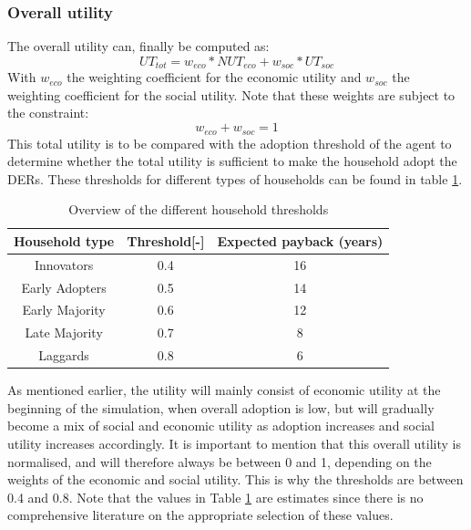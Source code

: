 \subsubsection{Overall utility}
The overall utility can, finally be computed as:
\begin{equation} \label{totut}
    UT_{tot} = w_{eco}*NUT_{eco} + w_{soc}*UT_{soc}
\end{equation}
With $w_{eco}$ the weighting coefficient for the economic utility and $w_{soc}$ the weighting coefficient for the social utility. Note that these weights are subject to the constraint:
\begin{equation}
    w_{eco} + w_{soc} = 1
\end{equation}
This total utility is to be compared with the adoption threshold of the agent to determine whether the total utility is sufficient to make the household adopt the DERs. These thresholds for different types of households can be found in table \ref{table:threshold}.
\begin{table}[h]
\centering
 \begin{tabular}{||c|c|c||} 
 \hline
 \textbf{Household type} & \textbf{Threshold[-]} & \textbf{Expected payback (years)}\\
 \hline \hline
 Innovators & 0.4 & 16 \\
 Early Adopters &0.5 & 14\\
 Early Majority & 0.6 & 12\\
 Late Majority & 0.7 & 8\\
 Laggards & 0.8 & 6\\
 \hline
 \end{tabular}
 \caption[Overview of the different household thresholds]{Overview of the different household thresholds}
 \label{table:threshold}
\end{table}
\noindent
As mentioned earlier, the utility will mainly consist of economic utility at the beginning of the simulation, when overall adoption is low, but will gradually become a mix of social and economic utility as adoption increases and social utility increases accordingly. It is important to mention that this overall utility is normalised, and will therefore always be between 0 and 1, depending on the weights of the economic and social utility. This is why the thresholds are between 0.4 and 0.8. Note that the values in Table \ref{table:threshold} are estimates since there is no comprehensive literature on the appropriate selection of these values. 
\newline \newline \noindent
